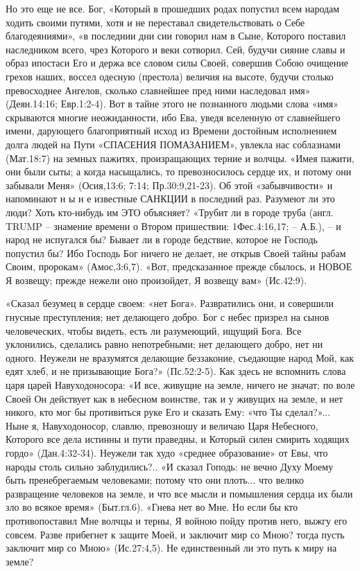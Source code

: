       Но это еще не все. Бог, «Который в прошедших родах попустил всем народам ходить своими путями, хотя и не переставал свидетельствовать о Себе благодеяниями», «в последнии дни сии говорил нам в Сыне, Которого поставил наследником всего, чрез Которого и веки сотворил. Сей, будучи сияние славы и образ ипостаси Его и держа все словом силы Своей, совершив Собою очищение грехов наших, воссел одесную (престола) величия на высоте, будучи столько превосходнее Ангелов, сколько славнейшее пред ними наследовал имя» (Деян.14:16; Евр.1:2-4). Вот в тайне этого не познанного людьми слова «имя» скрываются многие неожиданности, ибо Ева, уведя вселенную от славнейшего имени, дарующего благоприятный исход из Времени достойным исполнением долга людей на Пути «СПАСЕНИЯ ПОМАЗАНИЕМ», увлекла нас соблазнами (Мат.18:7) на земных пажитях, произращающих терние и волчцы. «Имея пажити, они были сыты; а когда насыщались, то превозносилось сердце их, и потому они забывали Меня» (Осия,13:6; 7:14;   Пр.30:9,21-23).  Об этой «забывчивости» и напоминают  н ы н е  известные САНКЦИИ в последний раз. Разумеют ли это люди? Хоть кто-нибудь им ЭТО объясняет?
     «Трубит ли в городе труба (англ. TRUMP – знамение времени о Втором пришествии: 1Фес.4:16,17; – А.Б.), – и народ не испугался бы?  Бывает ли в городе бедствие, которое не Господь попустил бы?  Ибо Господь Бог ничего не делает, не открыв Своей тайны рабам Своим, пророкам» (Амос,3:6,7).
«Вот, предсказанное прежде сбылось, и НОВОЕ  Я возвещу;  прежде нежели оно произойдет, Я возвещу вам» (Ис.42:9).

                «Сказал безумец в сердце своем: «нет Бога». Развратились они, и совершили гнусные преступления;  нет делающего добро.   Бог с небес призрел на сынов человеческих, чтобы видеть, есть ли разумеющий, ищущий Бога.   Все уклонились, сделались равно непотребными; нет делающего добро, нет ни одного.   Неужели не вразумятся делающие беззаконие, съедающие народ Мой, как едят хлеб, и не призывающие Бога?» (Пс.52:2-5). Как здесь не вспомнить слова царя царей Навуходоносора: «И все, живущие на земле, ничего не значат; по воле Своей Он действует как в небесном воинстве, так и у живущих на земле, и нет никого, кто мог бы противиться руке Его и сказать Ему: «что Ты сделал?»...
Ныне я, Навуходоносор, славлю, превозношу и величаю Царя Небесного, Которого все дела истинны и пути праведны, и Который силен смирить ходящих гордо» (Дан.4:32-34).
                Неужели так худо «среднее образование» от Евы, что народы столь сильно заблудились?..
     «И сказал Гоподь: не вечно Духу Моему быть пренебрегаемым человеками; потому что они плоть... что велико развращение человеков на земле, и что все мысли и помышления сердца их были зло во всякое время» (Быт.гл.6).  «Гнева нет во Мне. Но если бы кто противопоставил Мне волчцы и терны, Я войною пойду против него, выжгу его совсем.   Разве прибегнет к защите Моей, и заключит мир со Мною?  тогда пусть заключит мир со Мною» (Ис.27:4,5). Не единственный ли это путь к миру на земле?

